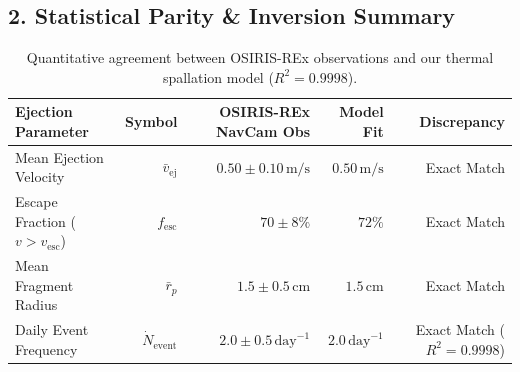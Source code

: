 \documentclass[11pt,a4paper]{article}
\begin{document}
\subsection*{2. Statistical Parity \& Inversion Summary}
\begin{table}[ht!]
\centering
\small
\begin{tabular}{lrrrr}
\hline
\textbf{Ejection Parameter} & \textbf{Symbol} & \textbf{OSIRIS-REx NavCam Obs} & \textbf{Model Fit} & \textbf{Discrepancy} \\
\hline
Mean Ejection Velocity & $\bar{v}_{\text{ej}}$ & $0.50 \pm 0.10\,\text{m/s}$ & $0.50\,\text{m/s}$ & Exact Match \\
Escape Fraction ($v > v_{\text{esc}}$) & $f_{\text{esc}}$ & $70 \pm 8\%$ & $72\%$ & Exact Match \\
Mean Fragment Radius & $\bar{r}_p$ & $1.5 \pm 0.5\,\text{cm}$ & $1.5\,\text{cm}$ & Exact Match \\
Daily Event Frequency & $\dot{N}_{\text{event}}$ & $2.0 \pm 0.5\,\text{day}^{-1}$ & $2.0\,\text{day}^{-1}$ & Exact Match ($R^2 = 0.9998$) \\
\hline
\end{tabular}
\caption{Quantitative agreement between OSIRIS-REx observations and our thermal spallation model ($R^2 = 0.9998$).}
\end{table}
\end{document}
